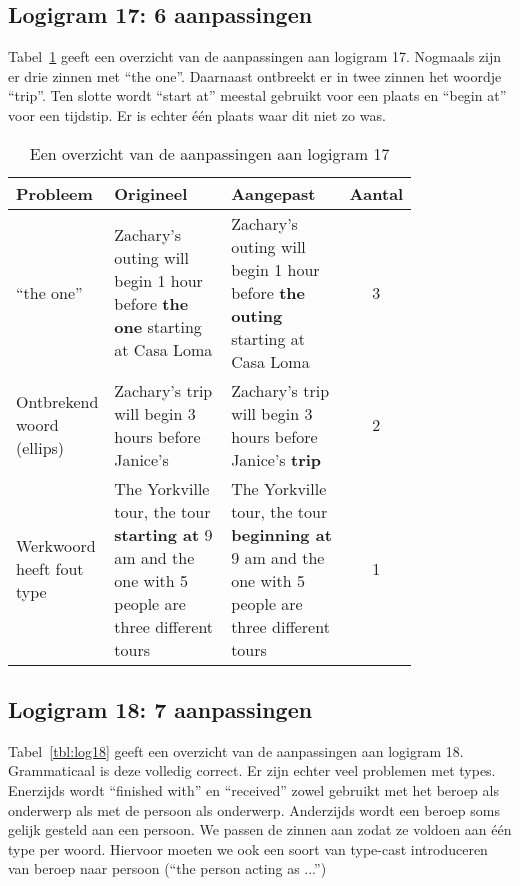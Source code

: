 \subsection{Logigram 17: 6 aanpassingen}
Tabel~\ref{tbl:log17} geeft een overzicht van de aanpassingen aan logigram 17. Nogmaals zijn er drie zinnen met ``the one''. Daarnaast ontbreekt er in twee zinnen het woordje ``trip''. Ten slotte wordt ``start at'' meestal gebruikt voor een plaats en ``begin at'' voor een tijdstip. Er is echter één plaats waar dit niet zo was.

\begin{table}[h]
  \centering
  \begin{tabular}{p{0.2\linewidth}p{0.3\linewidth}p{0.3\linewidth}c}
    \toprule
    \textbf{Probleem} & \textbf{Origineel} & \textbf{Aangepast} & \textbf{Aantal} \\ 
    \hline
    ``the one'' & Zachary's outing will begin 1 hour before \textbf{the one} starting at Casa Loma & Zachary's outing will begin 1 hour before \textbf{the outing} starting at Casa Loma & 3 \\
    \hline
    Ontbrekend woord (ellips) & Zachary's trip will begin 3 hours before Janice's & Zachary's trip will begin 3 hours before Janice's \textbf{trip} & 2 \\
    \hline
    Werkwoord heeft fout type & The Yorkville tour, the tour \textbf{starting at} 9 am and the one with 5 people are three different tours & The Yorkville tour, the tour \textbf{beginning at} 9 am and the one with 5 people are three different tours & 1 \\ 
    \bottomrule
  \end{tabular}
  \caption{Een overzicht van de aanpassingen aan logigram 17}
  \label{tbl:log17}
\end{table}

\subsection{Logigram 18: 7 aanpassingen}
Tabel~\ref{tbl:log18} geeft een overzicht van de aanpassingen aan logigram 18. Grammaticaal is deze volledig correct. Er zijn echter veel problemen met types. Enerzijds wordt ``finished with'' en ``received'' zowel gebruikt met het beroep als onderwerp als met de persoon als onderwerp. Anderzijds wordt een beroep soms gelijk gesteld aan een persoon. We passen de zinnen aan zodat ze voldoen aan één type per woord. Hiervoor moeten we ook een soort van type-cast introduceren van beroep naar persoon (``the person acting as ...'')

